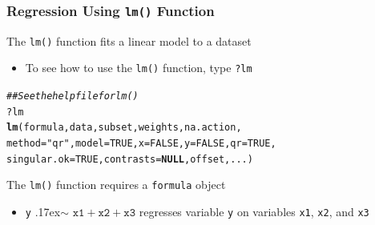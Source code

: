 \documentclass{beamer}\usepackage[]{graphicx}\usepackage[]{xcolor}
\makeatletter
\newcommand{\hlnum}[1]{\textcolor[rgb]{0.686,0.059,0.569}{#1}}%
\newcommand{\hlstr}[1]{\textcolor[rgb]{0.192,0.494,0.8}{#1}}%
\newcommand{\hlcom}[1]{\textcolor[rgb]{0.678,0.584,0.686}{\textit{#1}}}%
\newcommand{\hlopt}[1]{\textcolor[rgb]{0,0,0}{#1}}%
\newcommand{\hlstd}[1]{\textcolor[rgb]{0.345,0.345,0.345}{#1}}%
\newcommand{\hlkwa}[1]{\textcolor[rgb]{0.161,0.373,0.58}{\textbf{#1}}}%
\newcommand{\hlkwc}[1]{\textcolor[rgb]{0.333,0.667,0.333}{#1}}%
\newcommand{\hlkwd}[1]{\textcolor[rgb]{0.737,0.353,0.396}{\textbf{#1}}}%
\newenvironment{kframe}{%
 \def\at@end@of@kframe{}%
 \ifinner\ifhmode%
  \def\at@end@of@kframe{\end{minipage}}%
  \begin{minipage}{\columnwidth}%
 \fi\fi%
 \def\FrameCommand##1{\hskip\@totalleftmargin \hskip-\fboxsep
 \colorbox{shadecolor}{##1}\hskip-\fboxsep
     \hskip-\linewidth \hskip-\@totalleftmargin \hskip\columnwidth}%
 \MakeFramed {\advance\hsize-\width
   \@totalleftmargin\z@ \linewidth\hsize
   \@setminipage}}%
 {\par\unskip\endMakeFramed%
 \at@end@of@kframe}
\newenvironment{knitrout}{}{} %
\makeatother
\begin{document}
\begin{frame}[fragile]\frametitle{Regression Using \texttt{lm()} Function}
    The \texttt{lm()} function fits a linear model to a dataset
    \begin{itemize}
        \item To see how to use the \texttt{lm()} function, type \texttt{?lm}
    \end{itemize}
\begin{knitrout}\footnotesize
{}\color{fgcolor}\begin{kframe}
\begin{alltt}
\hlcom{## See the help file for lm()}
\hlopt{?}\hlstd{lm}
\hlkwd{lm}\hlstd{(formula, data, subset, weights, na.action,}
   \hlkwc{method} \hlstd{=} \hlstr{"qr"}\hlstd{,} \hlkwc{model} \hlstd{=} \hlnum{TRUE}\hlstd{,} \hlkwc{x} \hlstd{=} \hlnum{FALSE}\hlstd{,} \hlkwc{y} \hlstd{=} \hlnum{FALSE}\hlstd{,} \hlkwc{qr} \hlstd{=} \hlnum{TRUE}\hlstd{,}
   \hlkwc{singular.ok} \hlstd{=} \hlnum{TRUE}\hlstd{,} \hlkwc{contrasts} \hlstd{=} \hlkwa{NULL}\hlstd{, offset, ...)}
\end{alltt}
\end{kframe}
\end{knitrout}
    \vspace{2ex}
    The \texttt{lm()} function requires a \texttt{formula} object
    \begin{itemize}
        \item \texttt{y} {\raise.17ex\hbox{$\scriptstyle\mathtt{\sim}$}} $\mathtt{x1 + x2 + x3}$ regresses variable \texttt{y} on variables \texttt{x1}, \texttt{x2}, and \texttt{x3}
    \end{itemize}
\end{frame}
\end{document}
